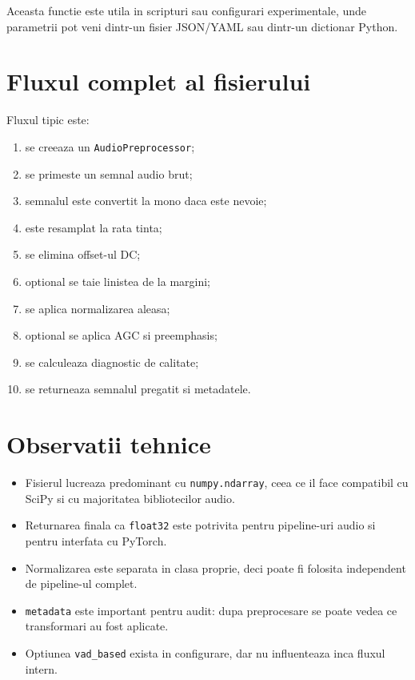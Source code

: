 \documentclass[12pt,a4paper]{report}
\begin{document}
Aceasta functie este utila in scripturi sau configurari experimentale, unde parametrii pot veni dintr-un fisier JSON/YAML sau dintr-un dictionar Python.

\chapter{Fluxul complet al fisierului}

Fluxul tipic este:

\begin{enumerate}
    \item se creeaza un \texttt{AudioPreprocessor};
    \item se primeste un semnal audio brut;
    \item semnalul este convertit la mono daca este nevoie;
    \item este resamplat la rata tinta;
    \item se elimina offset-ul DC;
    \item optional se taie linistea de la margini;
    \item se aplica normalizarea aleasa;
    \item optional se aplica AGC si preemphasis;
    \item se calculeaza diagnostic de calitate;
    \item se returneaza semnalul pregatit si metadatele.
\end{enumerate}

\chapter{Observatii tehnice}

\begin{itemize}
    \item Fisierul lucreaza predominant cu \texttt{numpy.ndarray}, ceea ce il face compatibil cu SciPy si cu majoritatea bibliotecilor audio.
    \item Returnarea finala ca \texttt{float32} este potrivita pentru pipeline-uri audio si pentru interfata cu PyTorch.
    \item Normalizarea este separata in clasa proprie, deci poate fi folosita independent de pipeline-ul complet.
    \item \texttt{metadata} este important pentru audit: dupa preprocesare se poate vedea ce transformari au fost aplicate.
    \item Optiunea \texttt{vad\_based} exista in configurare, dar nu influenteaza inca fluxul intern.
\end{itemize}
\end{document}
